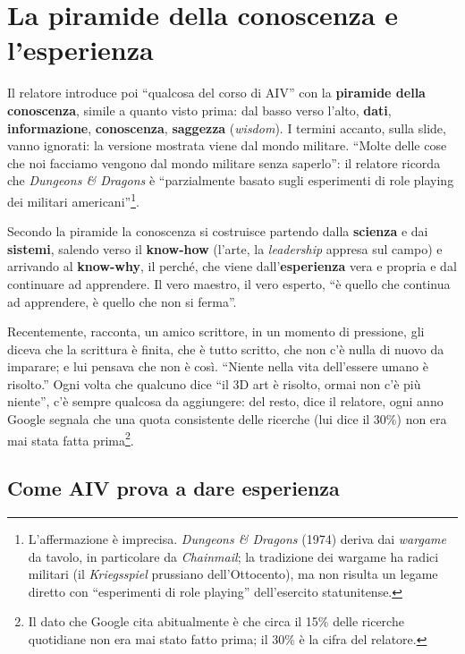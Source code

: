 \section{La piramide della conoscenza e l'esperienza}
\label{p0:sec:piramide}

Il relatore introduce poi ``qualcosa del corso di AIV'' con la
\textbf{piramide della conoscenza}, simile a quanto visto prima: dal basso
verso l'alto, \textbf{dati}, \textbf{informazione}, \textbf{conoscenza},
\textbf{saggezza} (\emph{wisdom}). I termini accanto, sulla slide, vanno
ignorati: la versione mostrata viene dal mondo militare. ``Molte delle cose
che noi facciamo vengono dal mondo militare senza saperlo'': il relatore
ricorda che \emph{Dungeons \& Dragons} è ``parzialmente basato sugli
esperimenti di role playing dei militari americani''\footnote{L'affermazione
è imprecisa. \emph{Dungeons \& Dragons} (1974) deriva dai \emph{wargame} da
tavolo, in particolare da \emph{Chainmail}; la tradizione dei wargame ha
radici militari (il \emph{Kriegsspiel} prussiano dell'Ottocento), ma non
risulta un legame diretto con ``esperimenti di role playing'' dell'esercito
statunitense.}.

Secondo la piramide la conoscenza si costruisce partendo dalla
\textbf{scienza} e dai \textbf{sistemi}, salendo verso il \textbf{know-how}
(l'arte, la \emph{leadership} appresa sul campo) e arrivando al
\textbf{know-why}, il perché, che viene dall'\textbf{esperienza} vera e
propria e dal continuare ad apprendere. Il vero maestro, il vero esperto,
``è quello che continua ad apprendere, è quello che non si ferma''.

Recentemente, racconta, un amico scrittore, in un momento di pressione, gli
diceva che la scrittura è finita, che è tutto scritto, che non c'è nulla di
nuovo da imparare; e lui pensava che non è così. ``Niente nella vita
dell'essere umano è risolto.'' Ogni volta che qualcuno dice ``il 3D art è
risolto, ormai non c'è più niente'', c'è sempre qualcosa da aggiungere: del
resto, dice il relatore, ogni anno Google segnala che una quota consistente
delle ricerche (lui dice il 30\%) non era mai stata fatta
prima\footnote{Il dato che Google cita abitualmente è che circa il 15\%
delle ricerche quotidiane non era mai stato fatto prima; il 30\% è la cifra
del relatore.}.

\subsection{Come AIV prova a dare esperienza}

